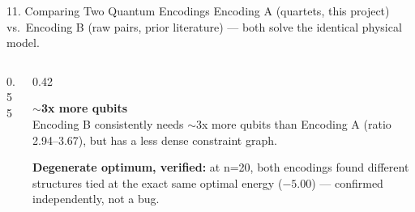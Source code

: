 \documentclass[aspectratio=169,10pt]{beamer}
\begin{document}
\begin{frame}{11. Comparing Two Quantum Encodings}
  \small Encoding A (quartets, this project) vs.\ Encoding B (raw pairs, prior literature) --- both solve the identical physical model.
  \vspace{4pt}
  \begin{columns}[T]
    \begin{column}{0.55\textwidth}
      \begin{center}
      \end{center}
    \end{column}
    \begin{column}{0.42\textwidth}
      \begin{navybox}
      \textbf{\large $\sim$3x more qubits}\\[3pt]
      \footnotesize Encoding B consistently needs $\sim$3x more qubits than Encoding A (ratio 2.94--3.67), but has a less dense constraint graph.
      \end{navybox}
      \vspace{6pt}
      \begin{cardbox}
      \footnotesize\textbf{\color{navy}Degenerate optimum, verified:} at n=20, both encodings found different structures tied at the exact same optimal energy ($-5.00$) --- confirmed independently, not a bug.
      \end{cardbox}
    \end{column}
  \end{columns}
\end{frame}
\end{document}
